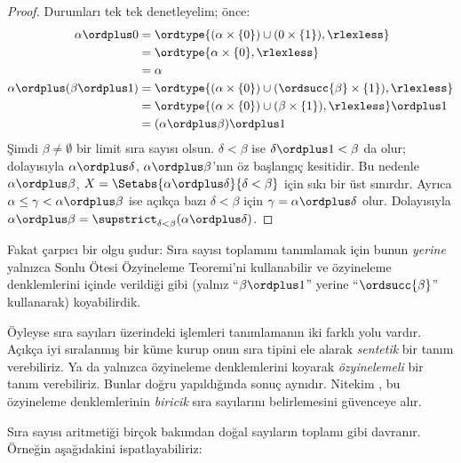 \begin{proof}
Durumları tek tek denetleyelim; önce:
\begin{align*}
	\alpha \ordplus 0
	&= \ordtype{(\alpha\times\{0\})\cup(0\times\{1\}),\rlexless}\\
	&= \ordtype{\alpha\times\{0\},\rlexless}\\
	&= \alpha\\
	\alpha \ordplus (\beta\ordplus 1)
	&= \ordtype{(\alpha\times\{0\})\cup(\ordsucc{\beta}\times\{1\}),\rlexless}\\
	&= \ordtype{(\alpha\times\{0\})\cup(\beta\times\{1\}),\rlexless}\ordplus 1\\
	&= (\alpha\ordplus\beta)\ordplus 1
\end{align*}
Şimdi $\beta\neq\emptyset$ bir limit sıra sayısı olsun. $\delta<\beta$ ise
$\delta\ordplus 1<\beta$ da olur; dolayısıyla
$\alpha\ordplus\delta$, $\alpha\ordplus\beta$'nın öz başlangıç kesitidir.
Bu nedenle $\alpha\ordplus\beta$,
$X=\Setabs{\alpha\ordplus\delta}{\delta<\beta}$ için sıkı bir üst
sınırdır. Ayrıca $\alpha\leq\gamma<\alpha\ordplus\beta$ ise açıkça bazı
$\delta<\beta$ için $\gamma=\alpha\ordplus\delta$ olur. Dolayısıyla
$\alpha\ordplus\beta=\supstrict_{\delta<\beta}(\alpha\ordplus\delta)$.
\end{proof}

Fakat çarpıcı bir olgu şudur: Sıra sayısı toplamını tanımlamak için bunun
\emph{yerine} yalnızca Sonlu Ötesi Özyineleme Teoremi'ni kullanabilir ve
özyineleme denklemlerini  içinde verildiği gibi
(yalnız ``$\beta\ordplus 1$'' yerine ``$\ordsucc{\beta}$'' kullanarak)
koyabilirdik.

Öyleyse sıra sayıları üzerindeki işlemleri tanımlamanın iki farklı yolu
vardır. Açıkça iyi sıralanmış bir küme kurup onun sıra tipini ele alarak
\emph{sentetik} bir tanım verebiliriz. Ya da yalnızca özyineleme denklemlerini
koyarak 
\emph{özyinelemeli} bir tanım verebiliriz. Bunlar doğru yapıldığında
sonuç aynıdır. Nitekim
, bu özyineleme
denklemlerinin 
\emph{biricik} sıra sayılarını belirlemesini güvenceye alır.

Sıra sayısı aritmetiği birçok bakımdan doğal sayıların toplamı gibi davranır.
Örneğin aşağıdakini ispatlayabiliriz:


